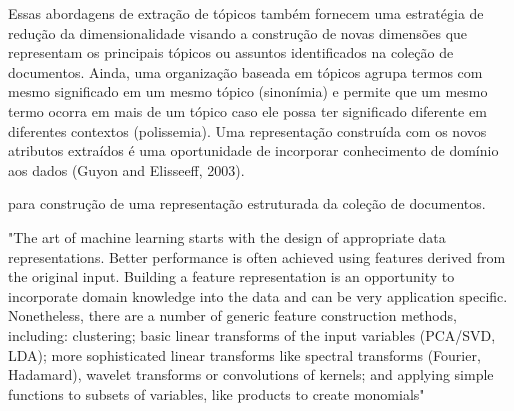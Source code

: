 















Essas abordagens de extração de tópicos também fornecem uma estratégia de redução da dimensionalidade visando a construção de novas dimensões que representam os principais tópicos ou assuntos identificados na coleção de documentos. Ainda, uma organização baseada em tópicos agrupa termos com mesmo significado em um mesmo tópico (sinonímia) e permite que um mesmo termo ocorra em mais de um tópico caso ele possa ter significado diferente em diferentes contextos (polissemia). Uma representação construída com os novos atributos extraídos é uma oportunidade de incorporar conhecimento de domínio aos dados (Guyon and Elisseeff, 2003).


para construção de uma representação estruturada da coleção de documentos.





"The art of machine learning starts with the design of appropriate data representations.  Better performance is often achieved using features derived from the original input. Building a feature representation is an opportunity to incorporate domain knowledge into the data and can be very application specific. Nonetheless, there are a number of generic feature construction methods, including: clustering; basic linear transforms of the input variables (PCA/SVD, LDA); more sophisticated linear transforms like spectral transforms (Fourier, Hadamard), wavelet transforms or convolutions of kernels; and applying simple functions to subsets of variables, like products to create monomials"






